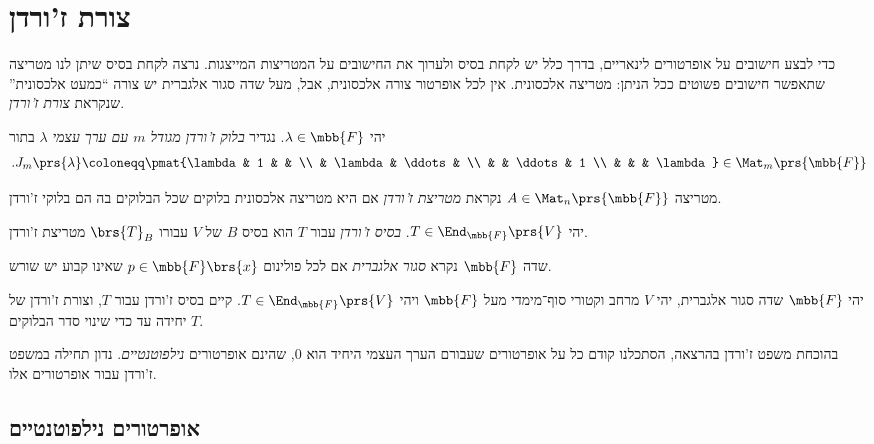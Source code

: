 \documentclass[a4paper,10pt,twoside,openany]{book}
\begin{document}
\chapter{צורת ז'ורדן}

כדי לבצע חישובים על אופרטורים לינאריים, בדרך כלל יש לקחת בסיס ולערוך את החישובים על המטריצות המייצגות.
נרצה לקחת בסיס שיתן לנו מטריצה שתאפשר חישובים פשוטים ככל הניתן: מטריצה אלכסונית. אין לכל אופרטור צורה אלכסונית, אבל, מעל שדה סגור אלגברית יש צורה
``כמעט אלכסונית'' שנקראת
\emph{צורת ז'ורדן}.

\begin{definition}
יהי
$\lambda \in \mbb{F}$.
נגדיר
\emph{בלוק ז'ורדן מגודל
$m$
עם ערך עצמי
$\lambda$}
בתור
\begin{align*}
\text{.} J_m\prs{\lambda} \coloneqq \pmat{\lambda & 1 & & \\ & \lambda & \ddots & \\ & & \ddots & 1 \\ & & & \lambda} \in \Mat_m\prs{\mbb{F}}
\end{align*}
\end{definition}

\begin{definition}
מטריצה
$A \in \Mat_n\prs{\mbb{F}}$
נקראת
\emph{מטריצת ז'ורדן}
אם היא מטריצה אלכסונית בלוקים שכל הבלוקים בה הם בלוקי ז'ורדן.
\end{definition}

\begin{definition}
יהי
$T \in \End_{\mbb{F}}\prs{V}$.
\emph{בסיס ז'ורדן}
עבור
$T$
הוא בסיס
$B$
של
$V$
עבורו
$\brs{T}_B$
מטריצת ז'ורדן.
\end{definition}

\begin{definition}
שדה
$\mbb{F}$
נקרא
\emph{סגור אלגברית}
אם לכל פולינום
$p \in \mbb{F}\brs{x}$
שאינו קבוע יש שורש.
\end{definition}

\begin{theorem}
יהי
$\mbb{F}$
שדה סגור אלגברית, יהי
$V$
מרחב וקטורי סוף־מימדי מעל
$\mbb{F}$
ויהי
$T \in \End_{\mbb{F}}\prs{V}$.
קיים בסיס ז'ורדן עבור
$T$,
וצורת ז'ורדן של
$T$
יחידה עד כדי שינוי סדר הבלוקים.
\end{theorem}

בהוכחת משפט ז'ורדן בהרצאה, הסתכלנו קודם כל על אופרטורים שעבורם הערך העצמי היחיד הוא
$0$,
שהינם אופרטורים
\emph{נילפוטנטיים}.
נדון תחילה במשפט ז'ורדן עבור אופרטורים אלו.

\section{אופרטורים נילפוטנטיים}
\end{document}
